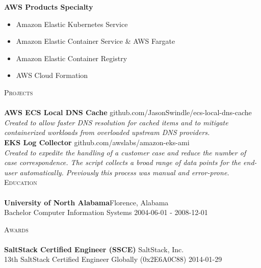 \documentclass[a4paper]{article}
\newcommand{\lineunder} {
    \vspace*{-8pt} \\
    \hspace*{-18pt} \hrulefill \\
}
\newcommand{\header} [1] {
    {\hspace*{-18pt}\vspace*{6pt} \textsc{#1}}
    \vspace*{-6pt} \lineunder
}
\begin{document}
\textbf{AWS Products Specialty}\\
\vspace{-1mm}
\begin{itemize} \itemsep 1pt
    \item Amazon Elastic Kubernetes Service
    \item Amazon Elastic Container Service \& AWS Fargate
    \item Amazon Elastic Container Registry
    \item AWS Cloud Formation
\end{itemize}

\header{Projects}
\textbf{AWS ECS Local DNS Cache} \hfill github.com/JasonSwindle/ecs-local-dns-cache\\
\textit{Created to allow faster DNS resolution for cached items and to mitigate containerized workloads from overloaded upstream DNS providers.} \\[1\baselineskip]


\textbf{EKS Log Collector} \hfill github.com/awslabs/amazon-eks-ami\\
\textit{Created to expedite the handling of a customer case and reduce the number of case correspondence. The script collects a broad range of data points for the end-user automatically. Previously this process  was manual and error-prone.} \\[1\baselineskip]


\header{Education}
\textbf{University of North Alabama}\hfill Florence, Alabama\\
Bachelor Computer Information Systems \hfill 2004-06-01 - 2008-12-01\\
\vspace{2mm}

\header{Awards}
\textbf{SaltStack Certified Engineer (SSCE)} \hfill SaltStack, Inc.\\
13th SaltStack Certified Engineer Globally (0x2E6A0C88) \hfill 2014-01-29\\
\vspace*{2mm}
\end{document}
